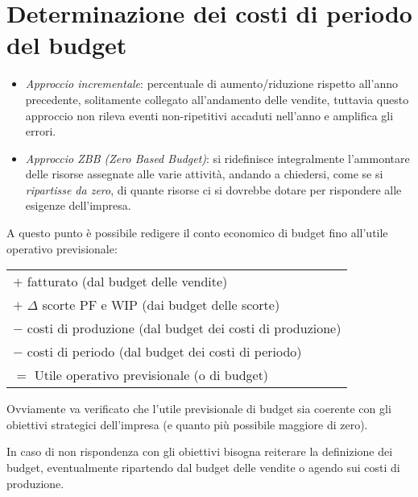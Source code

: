 \section{Determinazione dei costi di periodo del budget}
\begin{itemize}
	\item \emph{Approccio incrementale}: percentuale di aumento/riduzione rispetto all'anno
	precedente, solitamente collegato all’andamento delle vendite, tuttavia questo approccio non rileva eventi non-ripetitivi accaduti	nell’anno e amplifica gli errori.
	\item \emph{Approccio ZBB (Zero Based Budget)}: si ridefinisce integralmente
	l’ammontare delle risorse assegnate alle varie attività, andando a
	chiedersi, come se si \emph{ripartisse da zero}, di quante
	risorse ci si dovrebbe dotare per rispondere alle esigenze
	dell’impresa.
\end{itemize}

A questo punto è possibile redigere il conto economico di budget
fino all’utile operativo previsionale:

\begin{tabular}{l}
	$+$ fatturato (dal budget delle vendite)\\
	$+$ $\Delta$ scorte PF e WIP (dai budget delle scorte)\\
	$-$ costi di produzione (dal budget dei costi di produzione)\\
	$-$ costi di periodo (dal budget dei costi di periodo)\\\hline
	$=$ Utile operativo previsionale (o di budget)
\end{tabular}
\vspace{2em}

Ovviamente va verificato che l’utile previsionale di
budget sia coerente con gli obiettivi strategici dell’impresa
(e quanto più possibile maggiore di zero).

In caso di non rispondenza con gli obiettivi bisogna reiterare la
definizione dei budget, eventualmente ripartendo dal budget
delle vendite o agendo sui costi di produzione.
